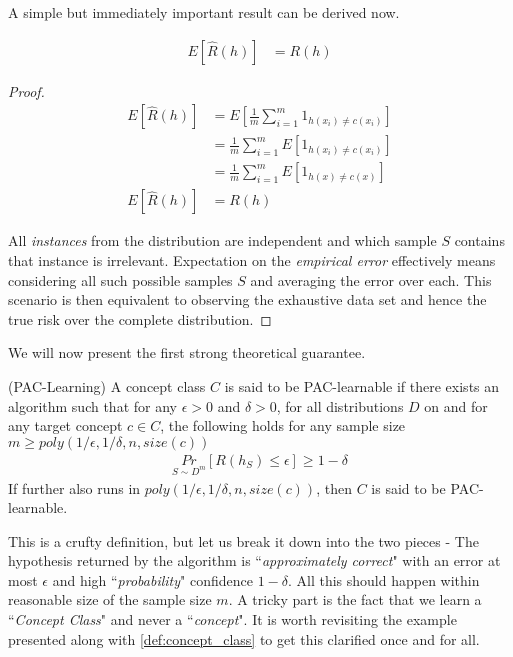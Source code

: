 \documentclass[../main]{subfiles}
\begin{document}
A simple but immediately important result can be derived now.

\begin{theorem} \label{th:exp_emp_risk}
\begin{align}
E[\hat{R}(h)] &= R(h)
\end{align}
\end{theorem}

\begin{proof}
\begin{align}
E[\hat{R}(h)] &= E[\frac{1}{m} \sum_{i=1}^{m} 1_{h(x_i) \neq c(x_i)}] \nonumber \\
&= \frac{1}{m} \sum_{i=1}^{m} E[1_{h(x_i) \neq c(x_i)}] \tag*{(Linearity of Expectation)} \nonumber \\
&= \frac{1}{m} \sum_{i=1}^{m} E[1_{h(x) \neq c(x)}] \tag*{(x are i.i.d)} \nonumber \\
E[\hat{R}(h)] &= R(h) \nonumber
\end{align}

All \textit{instances} from the distribution are independent and which sample $S$ contains
that instance is irrelevant. Expectation on the \textit{empirical error} effectively means
considering all such possible samples $S$ and averaging the error over each. This
scenario is then equivalent to observing the exhaustive data set and hence the true risk
over the complete distribution.
\end{proof}

We will now present the first strong theoretical guarantee.

\begin{definition}(PAC-Learning) \label{def:pac_learning}
A concept class $C$ is said to be PAC-learnable if there exists an algorithm 
such that for any $\epsilon > 0$ and $\delta > 0$, for all distributions $D$ on 
and for any target concept $c \in C$, the following holds for any sample size
$m \geq poly(1/\epsilon,1/\delta,n,size(c))$
\begin{align}
\underset{S \sim D^m}{Pr}[R(h_S) \leq \epsilon] \geq 1 - \delta \label{eq:pac_learning}
\end{align}
If further  also runs in $poly(1/\epsilon,1/\delta,n,size(c))$, then $C$ is said to
be PAC-learnable.
\end{definition}

This is a crufty definition, but let us break it down into the two pieces - The hypothesis
returned by the algorithm  is ``\textit{approximately correct}" with an error at
most $\epsilon$ and high ``\textit{probability}" confidence $ 1 - \delta $. All this should
happen within reasonable size of the sample size $m$. A tricky part is the fact that we
learn a ``\textit{Concept Class}" and never a ``\textit{concept}". It is worth revisiting the
example presented along with \ref{def:concept_class} to get this clarified once and for all.
\end{document}
